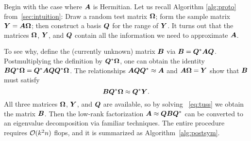 \documentclass[12pt]{article}
\begin{document}
Begin with the case where $\bm{A}$ is Hermitian.
Let us recall Algorithm \ref{alg:proto} from~\ref{sec:intuition}:
Draw a random test matrix $\bm{\Omega}$; form the sample matrix
$\bm{Y} = \bm{A\Omega}$; then construct a basis $\bm{Q}$ for the
range of $\bm{Y}$.  It turns out that the matrices $\bm{\Omega}$, $\bm{Y}$,
and $\bm{Q}$ contain all the information we need to approximate
$\bm{A}$.
 
To see why, define the (currently unknown) matrix $\bm{B}$
via $\bm{B} = \bm{Q}^* \bm{AQ}$.
Postmultiplying the definition by $\bm{Q}^* \bm{\Omega}$, one can obtain the identity
$\bm{BQ}^* \bm{\Omega} = \bm{Q}^* \bm{AQQ}^* \bm{\Omega}$.
The relationships $\bm{AQQ}^* \approx \bm{A}$ and $\bm{A\Omega} = \bm{Y}$
show that $\bm{B}$ must satisfy
\begin{equation}
\label{eq:tuss}
\bm{BQ}^{*}\bm{\Omega} \approx \bm{Q}^{*}\bm{Y}.
\end{equation}
All three matrices $\bm{\Omega}$, $\bm{Y}$, and $\bm{Q}$
are available, so by solving ~\eqref{eq:tuss} we obtain the matrix $\bm{B}$.
Then the low-rank factorization $\bm{A} \approx \bm{QBQ}^*$ can
be converted to an eigenvalue decomposition via familiar techniques.
The entire procedure requires $\mathcal{O}(k^2 n)$ flops, and it is summarized
as Algorithm~\ref{alg:postsym}.

\lsp
\end{document}
